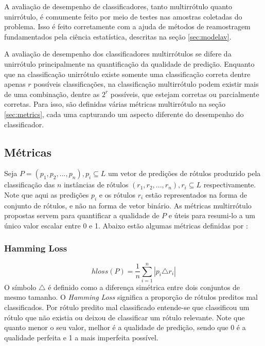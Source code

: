 A avaliação de desempenho de classificadores, tanto multirrótulo quanto unirrótulo, é comumente feito
por meio de testes nas amostras coletadas do problema.
Isso é feito corretamente com a ajuda de métodos de reamostragem fundamentados pela ciência estatística,
descritas na seção \ref{sec:modelav}.

A avaliação de desempenho dos classificadores multirrótulos se difere da unirrótulo principalmente na
quantificação da qualidade de predição. Enquanto que na classificação unirrótulo existe somente uma classificação
correta dentre apenas $r$ possíveis classificações, na classificação multirrótulo podem existir mais de uma combinação, 
dentre as $2^r$ possíveis, que estejam corretas ou parcialmente corretas.
Para isso, são definidas várias métricas multirrótulo na seção \ref{sec:metrics},
cada uma capturando um aspecto diferente do desempenho do classificador. 



\subsection{Métricas}
Seja $P=(p_1,p_2,...,p_n), p_i \subseteq L$
um vetor de predições de rótulos produzido pela
classificação das $n$ instâncias de rótulos $(r_1,r_2,...,r_n), r_i \subseteq L$
respectivamente. Note que aqui as predições $p_i$ e os rótulos $r_i$ estão representados na forma de conjunto de rótulos,
e não na forma de vetor binário.
As métricas multirrótulo propostas servem para quantificar a qualidade de $P$
e úteis para resumi-lo a um único valor escalar entre 0 e 1.
Abaixo estão algumas métricas definidas por \cite{reviewml2013}:
\label{sec:metrics}
\subsubsection{Hamming Loss}
\begin{equation}
 hloss(P)=\frac{1}{n} \sum_{i=1}^n{|p_i \triangle r_i|}
\end{equation}
O símbolo $\triangle$ é definido como a diferença simétrica entre dois conjuntos de mesmo tamanho.
O \textit{Hamming Loss} significa a proporção de rótulos preditos mal classificados. Por rótulo predito mal classificado
entende-se que classificou um rótulo que não existia ou deixou de classificar um rótulo relevante.
Note que quanto menor o seu valor, melhor é a qualidade de predição, sendo que 0 é a qualidade perfeita e 1 a mais
imperfeita possível.

